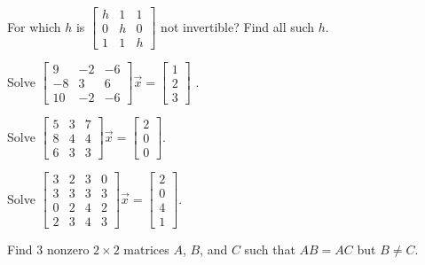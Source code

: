 \documentclass[12pt]{book}
\begin{document}
\begin{exercise}
For which $h$ is
$\left[ \begin{smallmatrix}
h & 1 & 1 \\
0 & h & 0 \\
1 & 1 & h
\end{smallmatrix} \right]$
not invertible?  Find all such $h$.
\end{exercise}

\begin{exercise}
Solve
$\left[ \begin{smallmatrix}
9 & -2 & -6 \\
-8 & 3 & 6 \\
10 & -2 & -6
\end{smallmatrix} \right] \vec{x} =
\left[ \begin{smallmatrix}
1 \\
2 \\
3
\end{smallmatrix} \right]$ .
\end{exercise}

\begin{exercise}
Solve
$\left[ \begin{smallmatrix}
5 & 3 & 7 \\
8 & 4 & 4 \\
6 & 3 & 3
\end{smallmatrix} \right] \vec{x} =
\left[ \begin{smallmatrix}
2 \\
0 \\
0
\end{smallmatrix} \right]$.
\end{exercise}

\begin{exercise}
Solve
$\left[ \begin{smallmatrix}
3 & 2 & 3 & 0 \\
3 & 3 & 3 & 3 \\
0 & 2 & 4 & 2 \\
2 & 3 & 4 & 3 
\end{smallmatrix} \right] \vec{x} =
\left[ \begin{smallmatrix}
2 \\
0 \\
4 \\
1
\end{smallmatrix} \right]$.
\end{exercise}

\begin{exercise}
Find 3 nonzero $2 \times 2$ matrices $A$, $B$, and $C$ such that
$AB = AC$ but $B \not= C$.
\end{exercise}
\end{document}
